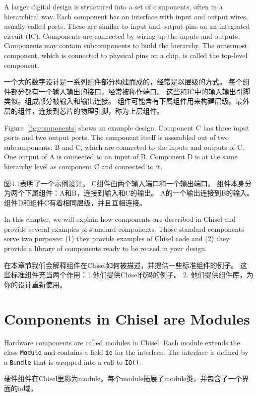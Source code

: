 \documentclass[%
    10pt,
    headinclude, footexclude,
    openright, %
    notitlepage,
    cleardoubleempty,
    headsepline,
    pointlessnumbers,
    bibtotoc, idxtotoc,
    ]{scrbook}
\newcommand{\code}[1]{{\small{\texttt{#1}}}}
\begin{document}
A larger digital design is structured into a set of components, often in
a hierarchical way. Each component has an interface with input and output
wires, usually called ports. These are similar to input and output pins on an integrated circuit (IC).
Components are connected by wiring up the inputs and outputs.
Components may contain subcomponents to build the hierarchy.
The outermost component, which is connected to physical pins
on a chip, is called the top-level component.

一个大的数字设计是一系列组件部分构建而成的，经常是以层级的方式。
每个组件部分都有一个输入输出的接口，经常被称作端口。
这些和IC中的输入输出引脚类似。组成部分被输入和输出连接。
组件可能含有下属组件用来构建层级。最外层的组件，连接到芯片的物理引脚，称为上层组件。

Figure~\ref{fig:components} shows an example design. Component C has
three input ports and two output ports. The component itself is assembled out
of two subcomponents: B and C, which are connected to the inputs and
outputs of C. One output of A is connected to an input of B.
Component D is at the same hierarchy level as component C and connected
to it.

图4.1表明了一个示例设计。
C组件由两个输入端口和一个输出端口。
组件本身分为两个下属组件：A和B，连接到输入和C的输出。
A的一个输出连接到B的输入。
组件D和组件C有着相同层级，并且互相连接。


In this chapter, we will explain how components are described in Chisel and
provide several examples of standard components.
Those standard components serve two purposes: (1) they provide examples
of Chisel code and (2) they provide a library of components ready to be reused
in your design.

在本章节我们会解释组件在Chisel如何被描述，并提供一些标准组件的例子。
这些标准组件充当两个作用：1.他们提供Chisel代码的例子。
2. 他们提供组件库，为你的设计重新使用。

\section{Components in Chisel are Modules}

Hardware components are called modules in Chisel. Each module extends
the class \code{Module} and contains a field \code{io} for the interface.
The interface is defined by a \code{Bundle} that is wrapped into a call to \code{IO()}.

硬件组件在Chisel里称为module。每个module拓展了module类，并包含了一个界面的io域。
\end{document}
